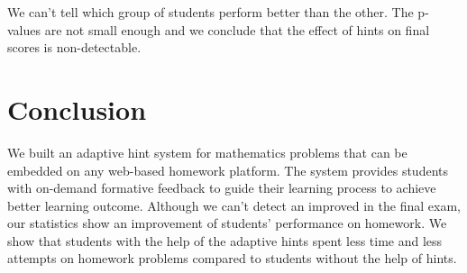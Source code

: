\documentclass{llncs2e/llncs}
\begin{document}
We can't tell which group of students perform better than the other. The p-values are not small enough and we conclude that the effect of hints on final scores is non-detectable.


\section{Conclusion}
We built an adaptive hint system for mathematics problems that can be embedded on any web-based homework platform. The system provides students with on-demand formative feedback to guide their learning process to achieve better learning outcome. Although we can't detect an improved in the final exam, our statistics show an improvement of students' performance on homework. We show that students with the help of the adaptive hints spent less time and less attempts on homework problems compared to students without the help of hints.

\newpage


\end{document}
